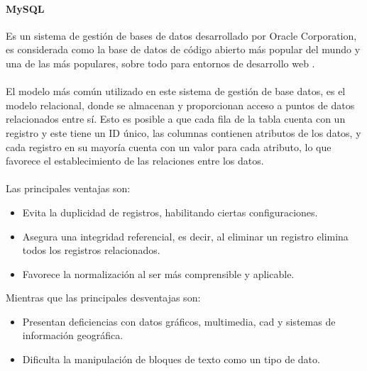 \documentclass[12pt, a4paper, titlepage]{report}
\begin{document}
            \paragraph{MySQL \\}
            Es un sistema de gestión de bases de datos desarrollado por Oracle Corporation, es considerada como la base de datos de código abierto más popular del mundo y una de las más populares, sobre todo para entornos de desarrollo web \cite{refmysql}.\\\\
            El modelo más común utilizado en este sistema de gestión de base datos, es el modelo relacional, donde se almacenan y proporcionan acceso a puntos de datos relacionados entre sí. Esto es posible a que cada fila de la tabla cuenta con un registro y este tiene un ID único, las columnas contienen atributos de los datos, y cada registro en su mayoría cuenta con un valor para cada atributo, lo que favorece el establecimiento de las relaciones entre los datos.\\\\
            Las principales ventajas son: 
            \begin{itemize}
                \item Evita la duplicidad de registros, habilitando ciertas configuraciones.
                \item Asegura una integridad referencial, es decir, al eliminar un registro elimina todos los registros relacionados.
                \item Favorece la normalización al ser más comprensible y aplicable.
            \end{itemize}

            Mientras que las principales desventajas son: 
            \begin{itemize}
                \item Presentan deficiencias con datos gráficos, multimedia, \acrshort{cad} y sistemas de información geográfica.
                \item Dificulta la manipulación de bloques de texto como un tipo de dato.
            \end{itemize}
			
\end{document}
